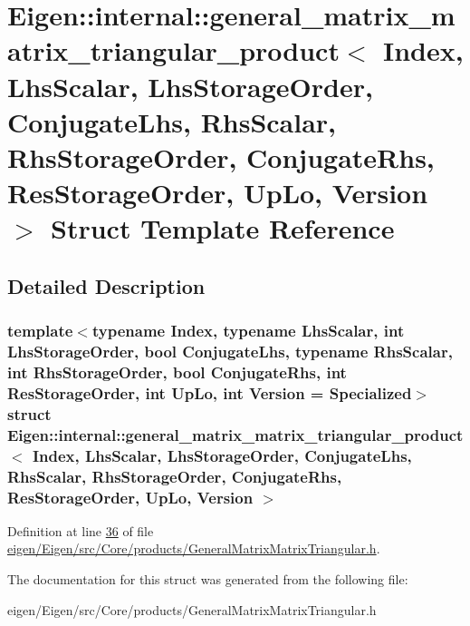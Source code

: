 \hypertarget{struct_eigen_1_1internal_1_1general__matrix__matrix__triangular__product}{}\section{Eigen\+:\+:internal\+:\+:general\+\_\+matrix\+\_\+matrix\+\_\+triangular\+\_\+product$<$ Index, Lhs\+Scalar, Lhs\+Storage\+Order, Conjugate\+Lhs, Rhs\+Scalar, Rhs\+Storage\+Order, Conjugate\+Rhs, Res\+Storage\+Order, Up\+Lo, Version $>$ Struct Template Reference}
\label{struct_eigen_1_1internal_1_1general__matrix__matrix__triangular__product}


\subsection{Detailed Description}
\subsubsection*{template$<$typename Index, typename Lhs\+Scalar, int Lhs\+Storage\+Order, bool Conjugate\+Lhs, typename Rhs\+Scalar, int Rhs\+Storage\+Order, bool Conjugate\+Rhs, int Res\+Storage\+Order, int Up\+Lo, int Version = Specialized$>$\newline
struct Eigen\+::internal\+::general\+\_\+matrix\+\_\+matrix\+\_\+triangular\+\_\+product$<$ Index, Lhs\+Scalar, Lhs\+Storage\+Order, Conjugate\+Lhs, Rhs\+Scalar, Rhs\+Storage\+Order, Conjugate\+Rhs, Res\+Storage\+Order, Up\+Lo, Version $>$}



Definition at line \hyperlink{eigen_2_eigen_2src_2_core_2products_2_general_matrix_matrix_triangular_8h_source_l00036}{36} of file \hyperlink{eigen_2_eigen_2src_2_core_2products_2_general_matrix_matrix_triangular_8h_source}{eigen/\+Eigen/src/\+Core/products/\+General\+Matrix\+Matrix\+Triangular.\+h}.



The documentation for this struct was generated from the following file\+:\begin{DoxyCompactItemize}
\item 
eigen/\+Eigen/src/\+Core/products/\+General\+Matrix\+Matrix\+Triangular.\+h\end{DoxyCompactItemize}
